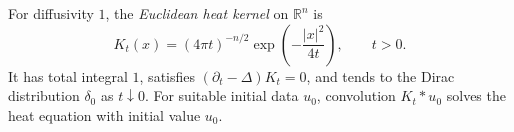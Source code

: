 
For diffusivity $1$, the \emph{Euclidean heat kernel} on $\mathbb R^n$ is
\[
K_t(x)=(4\pi t)^{-n/2}\exp\!\left(-\frac{|x|^2}{4t}\right),\qquad t>0.
\]
It has total integral $1$, satisfies $(\partial_t-\Delta)K_t=0$, and tends to the Dirac distribution $\delta_0$ as $t\downarrow0$. For suitable initial data $u_0$, convolution $K_t*u_0$ solves the heat equation with initial value $u_0$.
